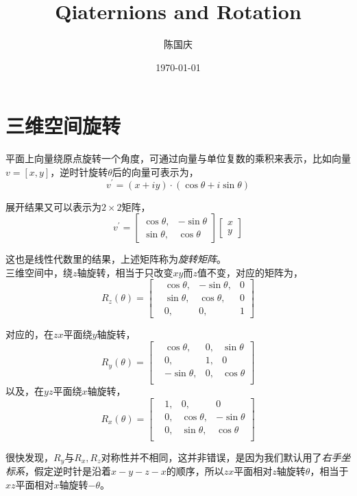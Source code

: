 \documentclass[hpyerref,UTF8,a4paper,titlepage,12pt,oneside]{ctexbook}
\title{Qiaternions and Rotation}
\author{陈国庆}
\date{\today}
\theoremstyle{definition}
\begin{document}
\maketitle
\tableofcontents

\section{三维空间旋转}

平面上向量绕原点旋转一个角度，可通过向量与单位复数的乘积来表示，比如向量$v= [x,y]$，逆时针旋转$\theta$后的向量可表示为，
$$
	v^\prime = (x + iy)\cdot (\cos \theta + i\sin\theta)
$$

展开结果又可以表示为$2\times 2$矩阵，
$$
	v^\prime = \begin{bmatrix}
		\cos\theta,& -\sin\theta\\
		\sin\theta,& \cos\theta
	\end{bmatrix}
	\begin{bmatrix}
		x\\
		y
	\end{bmatrix}
$$

这也是线性代数里的结果，上述矩阵称为\textit{旋转矩阵}。\\

三维空间中，绕$z$轴旋转，相当于只改变$xy$而$z$值不变，对应的矩阵为，
$$
	R_z(\theta) = \begin{bmatrix}
			&\cos\theta,&-\sin\theta, & 0\\
			&\sin\theta,&\cos\theta, &0\\
			&0,&0,&1
		\end{bmatrix}
$$

对应的，在$zx$平面绕$y$轴旋转，
$$
	R_y(\theta) = \begin{bmatrix}
			&\cos\theta,&0, &\sin\theta\\
			&0, &1,&0\\
			&-\sin\theta,&0,&\cos\theta\\
		\end{bmatrix}
$$
以及，在$yz$平面绕$x$轴旋转，
$$
	R_x(\theta) = \begin{bmatrix}
			&1,	&0,			&0\\
			&0, &\cos\theta,&-\sin\theta\\
			&0,	&\sin\theta,&\cos\theta\\
		\end{bmatrix}
$$
 
很快发现，$R_y$与$R_x,R_z$对称性并不相同，这并非错误，是因为我们默认用了\textit{右手坐标系}，假定逆时针是沿着$x-y-z-x$的顺序，所以$zx$平面相对$z$轴旋转$\theta$，相当于$xz$平面相对$x$轴旋转$-\theta$。
\end{document}
